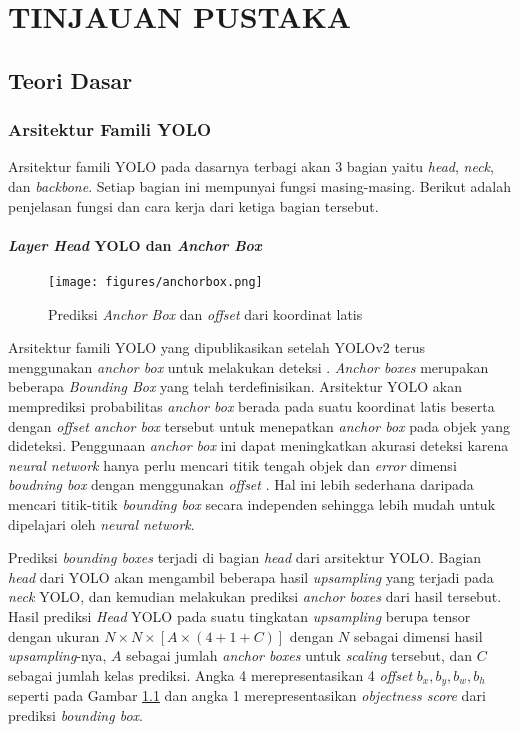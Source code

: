 \chapter{TINJAUAN PUSTAKA}
\section{Teori Dasar}
  \subsection{Arsitektur Famili YOLO}
    Arsitektur famili YOLO pada dasarnya terbagi akan 3 bagian yaitu \emph{head}, \emph{neck}, dan \emph{backbone}.
    Setiap bagian ini mempunyai fungsi masing-masing.
    Berikut adalah penjelasan fungsi dan cara kerja dari ketiga bagian tersebut.
    \subsubsection{\emph{Layer Head} YOLO dan \emph{Anchor Box}}
      \begin{figure}[ht]
          \centering
          \texttt{[image: figures/anchorbox.png]}
          \caption{Prediksi \emph{Anchor Box} dan \emph{offset} dari koordinat latis \parencite{yolov3}}
          \label{fig:anchorbox}
      \end{figure}
      Arsitektur famili YOLO yang dipublikasikan setelah YOLOv2 terus menggunakan \emph{anchor box} untuk melakukan deteksi \parencites{yolov2}{yolov3}{yolov4}{scaledyolov4}{yolov5}{yolor}{yolov7}.
      \emph{Anchor boxes} merupakan beberapa \emph{Bounding Box} yang telah terdefinisikan. 
      Arsitektur YOLO akan memprediksi probabilitas \emph{anchor box} berada pada suatu koordinat latis beserta dengan \emph{offset anchor box} tersebut untuk menepatkan \emph{anchor box} pada objek yang dideteksi.
      Penggunaan \emph{anchor box} ini dapat meningkatkan akurasi deteksi karena \emph{neural network} hanya perlu mencari titik tengah objek dan \emph{error} dimensi \emph{boudning box} dengan menggunakan \emph{offset} \parencite{yolov3}.
      Hal ini lebih sederhana daripada mencari titik-titik \emph{bounding box} secara independen sehingga lebih mudah untuk dipelajari oleh \emph{neural network}.
  
      Prediksi \emph{bounding boxes} terjadi di bagian \emph{head} dari arsitektur YOLO.
      Bagian \emph{head} dari YOLO akan mengambil beberapa hasil \emph{upsampling} yang terjadi pada \emph{neck} YOLO, dan kemudian melakukan prediksi \emph{anchor boxes} dari hasil tersebut.
      Hasil prediksi \emph{Head} YOLO pada suatu tingkatan \emph{upsampling} berupa tensor dengan ukuran $N\times N \times [A\times(4+1+C)]$ dengan $N$ sebagai dimensi hasil \emph{upsampling}-nya, $A$ sebagai jumlah \emph{anchor boxes} untuk \emph{scaling} tersebut, dan $C$ sebagai jumlah kelas prediksi.
      Angka 4 merepresentasikan 4 \emph{offset} $b_x, b_y, b_w, b_h$ seperti pada Gambar \ref{fig:anchorbox} dan angka 1 merepresentasikan \emph{objectness score} dari prediksi \emph{bounding box}.
  
